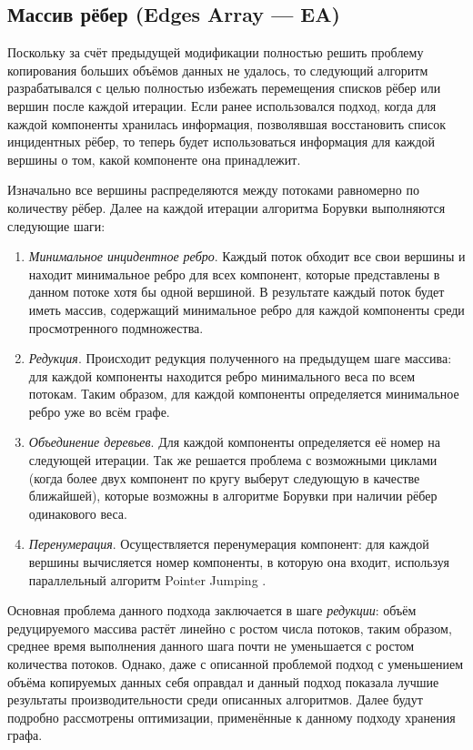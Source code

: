 \documentclass[a4paper,10pt]{extarticle}
\begin{document}
\subsection{Массив рёбер (Edges Array --- EA)}
\label{subsec:BoruvkaEA}

Поскольку за счёт предыдущей модификации полностью решить проблему копирования больших объёмов данных не удалось, то следующий алгоритм разрабатывался с целью полностью избежать перемещения списков рёбер или вершин после каждой итерации.
Если ранее использовался подход, когда для каждой компоненты хранилась информация, позволявшая восстановить список инцидентных рёбер, то теперь будет использоваться информация для каждой вершины о том, какой компоненте она принадлежит.

Изначально все вершины распределяются между потоками равномерно по количеству рёбер. Далее на каждой итерации алгоритма Борувки выполняются следующие шаги:

\begin{enumerate}
    \item \textit{Минимальное инцидентное ребро}.
		Каждый поток обходит все свои вершины и находит минимальное ребро для всех компонент, которые представлены в данном потоке хотя бы одной вершиной.
        В результате каждый поток будет иметь массив, содержащий минимальное ребро для каждой компоненты среди просмотренного подмножества.
    \item \textit{Редукция}.
          Происходит редукция полученного на предыдущем шаге массива: для каждой компоненты находится ребро минимального веса по всем потокам. 
          Таким образом, для каждой компоненты определяется минимальное ребро уже во всём графе.
    \item \textit{Объединение деревьев}.
          Для каждой компоненты определяется её номер на следующей итерации.
          Так же решается проблема с возможными циклами (когда более двух компонент по кругу выберут следующую в качестве ближайшей), которые возможны в алгоритме Борувки при наличии рёбер одинакового веса.
    \item \textit{Перенумерация}.
          Осуществляется перенумерация компонент: для каждой вершины вычисляется номер компоненты, в которую она входит, используя параллельный алгоритм Pointer Jumping \cite{pointer-jumping}.
\end{enumerate}

Основная проблема данного подхода заключается в шаге \textit{редукции}: объём редуцируемого массива растёт линейно с ростом числа потоков, таким образом, среднее время выполнения данного шага почти не уменьшается с ростом количества потоков.
Однако, даже с описанной проблемой подход с уменьшением объёма копируемых данных себя оправдал и данный подход показала лучшие результаты производительности среди описанных алгоритмов.
Далее будут подробно рассмотрены оптимизации, применённые к данному подходу хранения графа.
\end{document}
